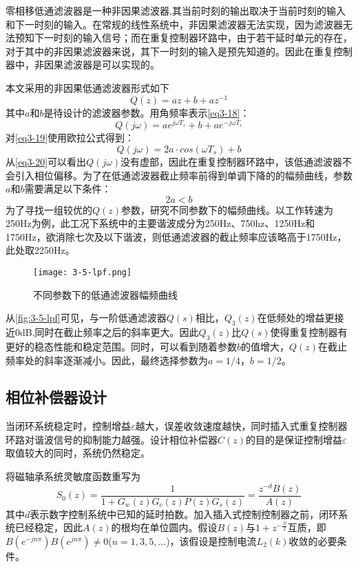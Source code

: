零相移低通滤波器是一种非因果滤波器,其当前时刻的输出取决于当前时刻的输入和下一时刻的输入。在常规的线性系统中，非因果滤波器无法实现，因为滤波器无法预知下一时刻的输入信号；而在重复控制器环路中，由于若干延时单元的存在，对于其中的非因果滤波器来说，其下一时刻的输入是预先知道的。因此在重复控制器中，非因果滤波器是可以实现的。

本文采用的非因果低通滤波器形式如下
\begin{equation}
\label{eq3-18}
Q(z)=az+b+az^{-1}
\end{equation}
其中$a$和$b$是待设计的滤波器参数。用角频率表示\autoref{eq3-18}：
\begin{equation}
\label{eq3-19}
Q(j\omega)=ae^{j\omega T_s}+b+ae^{-j\omega T_s}
\end{equation}
对\autoref{eq3-19}使用欧拉公式得到：
\begin{equation}
\label{eq3-20}
Q(j\omega)=2a\cdot cos(\omega T_s)+b
\end{equation}
从\autoref{eq3-20}可以看出$Q(j\omega)$没有虚部，因此在重复控制器环路中，该低通滤波器不会引入相位偏移。为了在低通滤波器截止频率前得到单调下降的的幅频曲线，参数$a$和$b$需要满足以下条件：
\begin{equation}
\label{eq3-21}
2a<b
\end{equation}
为了寻找一组较优的$Q(z)$参数，研究不同参数下的幅频曲线。以工作转速为250Hz为例，此工况下系统中的主要谐波成分为250Hz、750hz、1250Hz和1750Hz，欲消除七次及以下谐波，则低通滤波器的截止频率应该略高于1750Hz，此处取2250Hz。
\begin{figure}
	\texttt{[image: 3-5-lpf.png]}
	\caption{不同参数下的低通滤波器幅频曲线}
	\label{fig:3-5-lpf}
\end{figure}

从\autoref{fig:3-5-lpf}可见，与一阶低通滤波器$Q(s)$相比，$Q_3(z)$在低频处的增益更接近0dB,同时在截止频率之后的斜率更大。因此$Q_3(z)$比$Q(s)$使得重复控制器有更好的稳态性能和稳定范围。同时，可以看到随着参数$b$的值增大，$Q(z)$在截止频率处的斜率逐渐减小。因此，最终选择参数为$a=1/4$，$b=1/2$。
\subsection{相位补偿器设计}
当闭环系统稳定时，控制增益$\varepsilon$越大，误差收敛速度越快，同时插入式重复控制器环路对谐波信号的抑制能力越强。设计相位补偿器$C(z)$的目的是保证控制增益$\varepsilon$取值较大的同时，系统仍然稳定。

将磁轴承系统灵敏度函数重写为
\begin{equation}
\label{eq_s0z}
S_0(z)=\frac{1}{1+G_w(z)G_c(z)P(z)G_s(z)}=\frac{z^{-d}B(z)}{A(z)}
\end{equation}
其中$d$表示数字控制系统中已知的延时拍数。加入插入式控制控制器之前，闭环系统已经稳定，因此$A(z)$的根均在单位圆内。假设$B(z)$与$1+z^{-\frac{N}{2}}$互质，即$B(e^{-jn\pi})B(e^{jn\pi})\neq 0$($n=1,3,5,...$)，该假设是控制电流$L_2(k)$收敛的必要条件。

